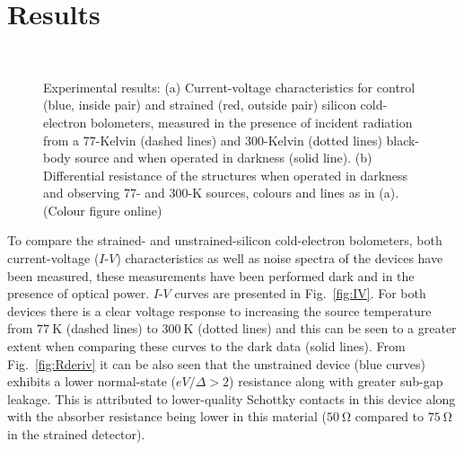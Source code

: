 \documentclass[final]{svjour2}
\begin{document}
\section{Results}
\begin{figure}[htb]
\centering
{}\\
\caption{Experimental results: (a) Current-voltage characteristics for control (blue, inside pair) and strained (red, outside pair) silicon cold-electron bolometers, measured in the presence of incident radiation from a 77-Kelvin (dashed lines) and 300-Kelvin (dotted lines) black-body source and when operated in darkness (solid line). (b) Differential resistance of the structures when operated in darkness and observing 77- and 300-K sources, colours and lines as in (a). (Colour figure online)}
\label{fig:data}
\end{figure}
To compare the strained- and unstrained-silicon cold-electron bolometers, both current-voltage ($I$-$V$) characteristics as well as noise spectra of the devices have been measured, these measurements have been performed dark and in the presence of optical power. $I$-$V$ curves are presented in Fig.~\ref{fig:IV}. For both devices there is a clear voltage response to increasing the source temperature from $77~\mathrm{K}$ (dashed lines) to $300~\mathrm{K}$ (dotted lines) and this can be seen to a greater extent when comparing these curves to the dark data (solid lines). From Fig.~\ref{fig:Rderiv} it can be also seen that the unstrained device (blue curves) exhibits a lower normal-state ($eV/\varDelta > 2$) resistance along with greater sub-gap leakage. This is attributed to lower-quality Schottky contacts in this device along with the absorber resistance being lower in this material ($50~\mathrm{\Omega}$ compared to $75~\mathrm{\Omega}$ in the strained detector).
\end{document}
